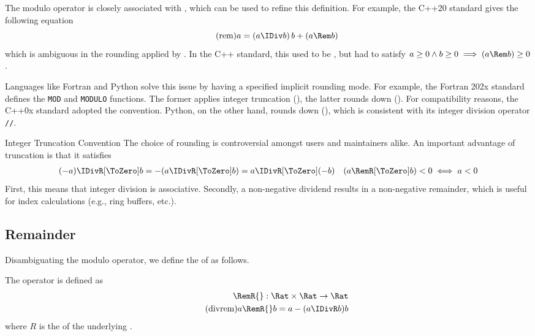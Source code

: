 The modulo operator is closely associated with  \IDiv{}, which can be used to refine this definition.
For example, the C++20 standard \cite{ISO_C_N4860} gives the following equation
\begin{equation}
    \label{eq:rem}
    \tag{rem}
    a = \left(a \IDiv b\right)b + (a \Rem b)
\end{equation}
which is ambiguous in the rounding applied by \IDiv{}.
In the C++ standard, this used to be \impldef, but had to satisfy \(a \ge 0 \land b \ge 0 \implies (a \Rem b) \ge 0\).

Languages like Fortran and Python solve this issue by having a specified implicit rounding mode.
For example, the Fortran 202x standard \cite{ISO_F_N2184} defines the \texttt{MOD} and \texttt{MODULO} functions.
The former applies integer truncation (\ToZero), the latter rounds down (\Down).
For compatibility reasons, the C++0x standard adopted the \ToZero{} convention.
Python, on the other hand, rounds down (\Down), which is consistent with its integer division operator \texttt{//}.

\begin{highlight}{Integer Truncation Convention}
The choice of rounding is controversial amongst users and maintainers alike.
An important advantage of truncation is that it satisfies
\begin{align*}
    (-a) \IDivR[\ToZero] b = -(a \IDivR[\ToZero] b) = a \IDivR[\ToZero] (-b) &&
    (a \RemR[\ToZero] b) < 0 \iff a < 0
\end{align*}
First, this means that integer division is associative.
Secondly, a non-negative dividend results in a non-negative remainder, which is useful for index calculations (e.g., ring buffers, etc.).
\end{highlight}

\subsection{Remainder}

Disambiguating the modulo operator, we define the  of  as follows.

\begin{definition}[Remainder]
    The  operator \RemR{} is defined as
    \begin{align*}
        \RemR{} : \Rat \times \Rat \to \Rat \\
        \label{eq:divrem}
        \tag{divrem}
        a \RemR{} b = a - (a \IDivR b)b
    \end{align*}
    where \(R\) is the  of the underlying .
\end{definition}

